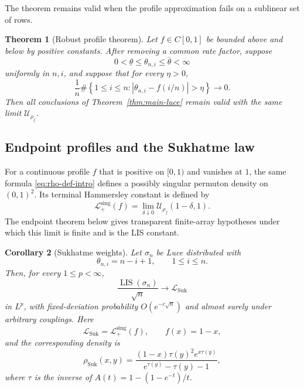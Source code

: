 \documentclass[11pt]{article}
\newtheorem{theorem}{Theorem}[section]
\newtheorem{corollary}[theorem]{Corollary}
\theoremstyle{remark}
\newcommand{\LIS}{\operatorname{LIS}}
\newcommand{\calL}{\mathcal L}
\newcommand{\calU}{\mathcal U}
\begin{document}
The theorem remains valid when the profile approximation fails on a
sublinear set of rows.

\begin{theorem}[Robust profile theorem]\label{thm:robust-luce}
Let $f\in C[0,1]$ be bounded above and below by positive constants.  After
removing a common rate factor, suppose
\begin{equation}\label{eq:comparable-rates}
        0<\underline\theta\le\theta_{n,i}
        \le\overline\theta<\infty
\end{equation}
uniformly in $n,i$, and suppose that for every $\eta>0$,
\begin{equation}\label{eq:profile-density-conv}
 \frac1n\#\left\{1\le i\le n:
       |\theta_{n,i}-f(i/n)|>\eta\right\}
 \longrightarrow0.
\end{equation}
Then all conclusions of Theorem~\ref{thm:main-luce} remain valid with the same
limit $\calU_{\rho_f}$.
\end{theorem}

\subsection{Endpoint profiles and the Sukhatme law}

For a continuous profile $f$ that is positive on $[0,1)$ and vanishes at
$1$, the same formula \eqref{eq:rho-def-intro} defines a possibly singular
permuton density on $(0,1)^2$.  Its terminal Hammersley constant is defined by
\begin{equation}\label{eq:singular-functional-intro}
        \calL_+^{\mathrm{sing}}(f)
        =\lim_{\delta\downarrow0}
          \calU_{\rho_f}(1-\delta,1).
\end{equation}
The endpoint theorem below gives transparent finite-array hypotheses under
which this limit is finite and is the LIS constant.

\begin{corollary}[Sukhatme weights]\label{cor:intro-sukhatme}
Let $\sigma_n$ be Luce distributed with
\[
        \theta_{n,i}=n-i+1,
        \qquad 1\le i\le n.
\]
Then, for every $1\le p<\infty$,
\begin{equation}\label{eq:sukhatme-intro}
        \frac{\LIS(\sigma_n)}{\sqrt n}
        \longrightarrow\calL_{\mathrm{Suk}}
\end{equation}
in $L^p$, with fixed-deviation probability $O(e^{-c\sqrt n})$ and almost
surely under arbitrary couplings.  Here
\[
        \calL_{\mathrm{Suk}}
        =\calL_+^{\mathrm{sing}}(f),
        \qquad f(x)=1-x,
\]
and the corresponding density is
\begin{equation}\label{eq:suk-rho-intro}
 \rho_{\mathrm{Suk}}(x,y)
 =\frac{(1-x)\tau(y)^2e^{x\tau(y)}}
        {e^{\tau(y)}-\tau(y)-1},
\end{equation}
where $\tau$ is the inverse of
$A(t)=1-(1-e^{-t})/t$.
\end{corollary}
\end{document}
